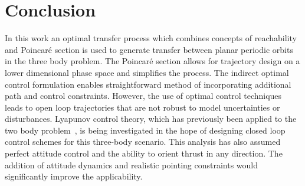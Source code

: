 \documentclass[letterpaper, preprint, paper,11pt]{AAS}	%
\begin{document}
%
%
%
%
\section{Conclusion}\label{sec:conclusion}
In this work an optimal transfer process which combines concepts of reachability and Poincar\'e section is used to generate transfer between planar periodic orbits in the three body problem.
The Poincar\'e section allows for trajectory design on a lower dimensional phase space and simplifies the process.
The indirect optimal control formulation enables straightforward method of incorporating additional path and control constraints.
However, the use of optimal control techniques leads to open loop trajectories that are not robust to model uncertainties or disturbances.
Lyapunov control theory, which has previously been applied to the two body problem~\cite{chang2002}, is being investigated in the hope of designing closed loop control schemes for this three-body scenario.
This analysis has also assumed perfect attitude control and the ability to orient thrust in any direction.
The addition of attitude dynamics and realistic pointing constraints would significantly improve the applicability.



\appendix
\end{document}
